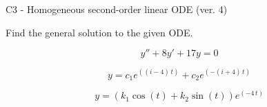 \begin{exercise}
  \begin{exerciseTitle}C3 - Homogeneous second-order linear ODE (ver. 4)\end{exerciseTitle}
  \begin{exerciseStatement}
    
Find the general solution to the given ODE.

    
\[y''+8y'+17y = 0\]

  \end{exerciseStatement}
  \begin{exerciseAnswer}
    
\[y= c_{1} e^{\left(\left(i - 4\right) \, t\right)} + c_{2} e^{\left(-\left(i + 4\right) \, t\right)}\]

    
\[y= {\left(k_{1} \cos\left(t\right) + k_{2} \sin\left(t\right)\right)} e^{\left(-4 \, t\right)}\]

  \end{exerciseAnswer}
\end{exercise}